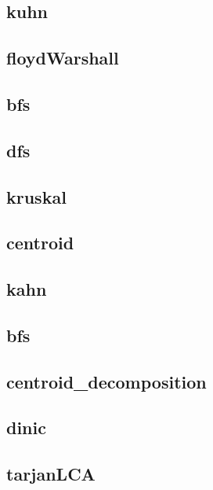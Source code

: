 \subsection{kuhn}
\raggedbottom
\hrulefill
\subsection{floydWarshall}
\raggedbottom
\hrulefill
\subsection{bfs}
\raggedbottom
\hrulefill
\subsection{dfs}
\raggedbottom
\hrulefill
\subsection{kruskal}
\raggedbottom
\hrulefill
\subsection{centroid}
\raggedbottom
\hrulefill
\subsection{kahn}
\raggedbottom
\hrulefill
\subsection{bfs}
\raggedbottom
\hrulefill
\subsection{centroid_decomposition}
\raggedbottom
\hrulefill
\subsection{dinic}
\raggedbottom
\hrulefill
\subsection{tarjanLCA}
\raggedbottom
\hrulefill
